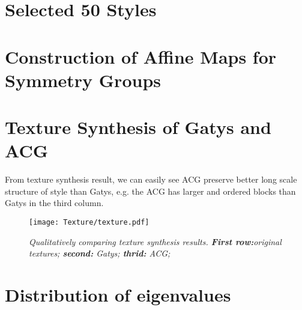 \section{Selected 50 Styles}




\section{Construction of Affine Maps for Symmetry Groups}


\section{Texture Synthesis of Gatys and ACG}

From texture synthesis result, we can easily see ACG preserve better long scale structure of style than Gatys, e.g. the ACG has larger and ordered blocks than Gatys in the third  column.
\begin{figure}
\centering
\texttt{[image: Texture/texture.pdf]}
\caption{\em Qualitatively comparing texture synthesis results. \textbf{First row:}original textures; \textbf{second:} Gatys; \textbf{thrid:} ACG; }
\end{figure}

\section{Distribution of eigenvalues}



